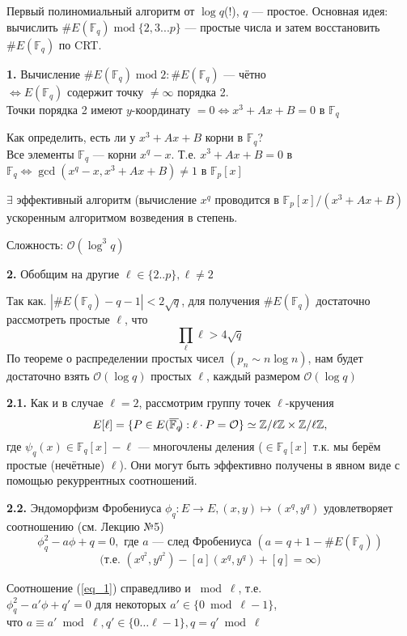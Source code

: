 \documentclass[12pt]{article}
\newcommand{\Z}{{{\mathbb Z}}}
\newcommand{\F}{{{\mathbb F}}}
\newcommand{\bigO}{\mathcal{O}}
\newcommand{\overbar}[1]{\overline{\mkern-0.0mu#1\mkern-4.0mu}}
\theoremstyle{definition}
\theoremstyle{definition}
\theoremstyle{definition}
\begin{document}
Первый полиномиальный алгоритм от $\log q$(!), $q$ — простое. 
Основная идея: вычислить $\#E(\F_q) \operatorname{mod} \{2, 3 ... p\}$ — простые числа и затем восстановить $\#E(\F_q)$ по CRT.

\textbf{1.} Вычисление $\#E(\F_q) \operatorname{mod} 2: \#E(\F_q)$ — чётно \\
$\Leftrightarrow E(\F_q)$ содержит точку $\neq \infty$ порядка 2. \\
Точки порядка 2 имеют $y$-координату $= 0 \Leftrightarrow x^3 + Ax+B = 0$ в $\F_q$

Как определить, есть ли у $x^3 + Ax+ B$ корни в $\F_q$?\\
Все элементы $\F_q$ — корни $x^q-x$. Т.е. $x^3+Ax+B=0$ в $\F_q \Leftrightarrow \gcd(x^q - x, x^3+Ax+B) \neq 1$ в $\F_p[x]$

$\exists$ эффективный алгоритм (вычисление $x^q$ проводится в $\F_p[x] / (x^3 + Ax+ B)$ ускоренным алгоритмом возведения в степень.

Сложность: $\bigO(\log^3 q)$


\textbf{2.} Обобщим на другие $\ell \in \{2..p\}, \ell \neq 2$

Так как. $|\#E(\F_q) - q - 1| < 2\sqrt{q}$, для получения $\#E(\F_q)$ достаточно рассмотреть простые $\ell$, что 
\[
    \prod_\ell \ell > 4\sqrt{q}
\]
По теореме о распределении простых чисел $(p_n \sim n \log n)$, нам будет достаточно взять $\bigO(\log q)$ простых $\ell$, каждый размером $\bigO(\log q)$

\textbf{2.1.} Как и в случае $\ell = 2$, рассмотрим группу точек $\ell$-кручения 
\[
    E[\ell] = \{ P \in E(\overbar{\F_q}): \ell\cdot P = \bigO \} \simeq \Z/\ell\Z \times \Z/\ell\Z,
\]
где $\psi_q(x) \in \F_q[x] - \ell$ — многочлены деления ($\in \F_q[x]$ т.к. мы берём простые (нечётные) $\ell$). Они могут быть эффективно получены в явном виде с помощью рекуррентных соотношений.

\textbf{2.2.} Эндоморфизм Фробениуса $\phi_q: E \rightarrow E, (x,y)\mapsto (x^q, y^q)$ удовлетворяет соотношению (см. Лекцию №5)
\begin{equation}
\label{eq_1}
    \phi_q^2 - a\phi + q = 0, \text{ где } a \text{ — след Фробениуса } (a = q+1-\#E(\F_q))
\end{equation}
\[
    \text{(т.е. } (x^{q^2}, y^{q^2}) - [a](x^q, y^q) + [q] = \infty)
\]

Соотношение (\ref{eq_1}) справедливо и $\bmod \ell$, т.е.\\
$\phi_q^2 - a'\phi + q' = 0$ для некоторых $a' \in \{0 \bmod  \ell-1\}$,\\
что $a \equiv a' \bmod \ell, q' \in \{0 \ldots \ell-1\}, q=q' \bmod \ell$
\end{document}
